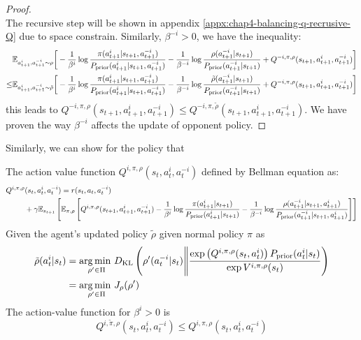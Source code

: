 \begin{proof}
\begin{equation}
\end{equation}
The recursive step will be shown in appendix \ref{appx:chap4-balancing-q-recrusive-Q} due to space constrain. Similarly, $\beta^{-i} > 0$, we have the inequality:
\begin{equation*}
\begin{aligned}
    &\mathbb{E}_{a^i_{t+1}, a^{-i}_{t+1} \sim \rho}\bigg[-\frac{1}{\beta^i}\log \frac{\pi(a^i_{t+1} | s_{t+1}, a^{-i}_{t+1})}{P_{\text{prior}}(a^i_{t+1} | s_{t+1}, a^{-i}_{t+1})} - \frac{1}{\beta^{-i}}\log \frac{\rho(a^{-i}_{t+1} | s_{t+1})}{P_{\text{prior}}(a^{-i}_{t+1} | s_{t+1})} + Q^{-i, \pi, \rho}(s_{t+1}, a^i_{t+1}, a^{-i}_{t+1}) \bigg] \\
    \le &\mathbb{E}_{a^i_{t+1}, a^{-i}_{t+1} \sim \tilde{\rho}}\bigg[-\frac{1}{\beta^i}\log \frac{\pi(a^i_{t+1} | s_{t+1}, a^{-i}_{t+1})}{P_{\text{prior}}(a^i_{t+1} | s_{t+1}, a^{-i}_{t+1})} - \frac{1}{\beta^{-i}}\log \frac{\tilde{\rho}(a^{-i}_{t+1} | s_{t+1})}{P_{\text{prior}}(a^{-i}_{t+1} | s_{t+1})} + Q^{-i, \pi, \rho}(s_{t+1}, a^i_{t+1}, a^{-i}_{t+1}) \bigg]
\end{aligned}
\end{equation*}
this leads to $Q^{-i, \pi, \rho}(s_{t+1}, a^i_{t+1}, a^{-i}_{t+1}) \le Q^{-i, \pi, \tilde{\rho}}(s_{t+1}, a^i_{t+1}, a^{-i}_{t+1})$. We have proven the way $\beta^{-i}$ affects the update of opponent policy.
\end{proof}
Similarly, we can show for the policy that 
\begin{theorem}
\label{thm:update-balance-agent}
    The action value function $Q^{i, \pi, \rho}(s_t, a^i_t, a^{-i}_t)$ defined by Bellman equation as:
    \begin{equation}
    \begin{aligned}
        Q^{i, \pi, \rho}&(s_t, a^i_t, a^{-i}_t) = r(s_t, a_t, a^{-i}_t) \\
        &+ \gamma\mathbb{E}_{s_{t+1}}\left[ \mathbb{E}_{\pi, \rho}\left[ Q^{i, \pi, \rho}(s_{t+1}, a^i_{t+1}, a^{-i}_{t+1}) - \frac{1}{\beta^i} \log\frac{\pi(a^i_{t+1}|s_{t+1})}{P_{\text{prior}}(a^i_{t+1}|s_{t+1})} - \frac{1}{\beta^{-i}}\log \frac{\rho(a^{-i}_{t+1}|s_{t+1}, a^i_{t+1})}{P_{\text{prior}}(a^{-i}_{t+1}|s_{t+1}, a^i_{t+1})} \right] \right]
    \end{aligned}
    \end{equation}
    Given the agent's updated policy $\tilde{\rho}$ given normal policy $\pi$ as 
    \begin{equation}
    \begin{aligned}
        \tilde{\rho}(a^{i}_t | s_t) &= \underset{\rho' \in \Pi}{\arg\min \ } D_{\mathrm{KL}} \left(  \rho'(a^{-i}_t | s_t) \Bigg\| \frac{\exp\left( Q^{i, \pi, \rho}(s_t, a^{i}_t) \right) P_{\text{prior}}(a^{i}_t | s_t)}{\exp V^{i, \pi, \rho}(s_t)} \right) \\
        &=\underset{\rho' \in \Pi}{\arg\min \ } J_{\rho}(\rho')
    \end{aligned}
    \end{equation}
    The action-value function for $\beta^i > 0$ is 
    \begin{equation}
    Q^{i, \tilde{\pi}, \rho}(s_t, a^i_t, a^{-i}_t) \le Q^{i, \pi, \rho}(s_t, a^i_t, a^{-i}_t)
    \end{equation}
\end{theorem}

